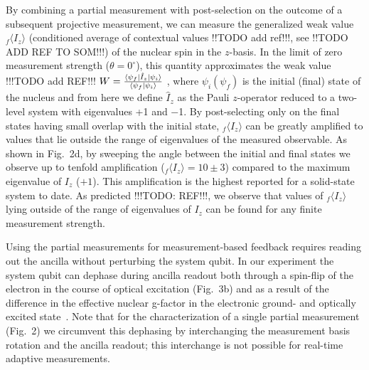 By combining a partial measurement with post-selection on the outcome of a subsequent projective measurement, we can measure the generalized weak value $_{f} \langle I_{z} \rangle$ (conditioned average of contextual values !!TODO add ref!!!, see !!TODO ADD REF TO SOM!!!) of the nuclear spin in the $z$-basis. In the limit of zero measurement strength ($\theta = 0^{\circ}$), this quantity approximates the weak value !!!TODO add REF!!!  $W = \frac{\langle \psi_f| \hat{I}_z \left|\psi_i\right\rangle}{\langle \psi_f| \psi_i \rangle}$ , where $ \psi_i (\psi_f )$ is the initial (final) state of the nucleus and from here we define $\hat{I}_z$ as the Pauli $z$-operator reduced to a two-level system with eigenvalues +1 and $-$1. By post-selecting only on the final states having small overlap with the initial state, $_{f} \langle I_{z} \rangle$ can be greatly amplified to values that lie outside the range of eigenvalues of the measured observable. As shown in Fig.~2d, by sweeping the angle between the initial and final states we observe up to tenfold amplification ($_{f} \langle I_{z} \rangle = 10 \pm 3$) compared to the maximum eigenvalue of $I_{z}$ ($+1$). This amplification is the highest reported for a solid-state system to date\cite{Groen_PRL_2013}. As predicted !!!TODO: REF!!!, we observe that values of  $_{f} \langle I_{z} \rangle$ lying outside of the range of eigenvalues of $I_{z}$ can be found for any finite measurement strength.

Using the partial measurements for measurement-based feedback requires reading out the ancilla without perturbing the system qubit. In our experiment the system qubit can dephase during ancilla readout both through a spin-flip of the electron in the course of optical excitation (Fig.~3b) and as a result of the difference in the effective nuclear g-factor in the electronic ground- and optically excited state~\cite{Jiang_PRL_2008}. Note that for the characterization of a single partial measurement (Fig.~2) we circumvent this dephasing by interchanging the measurement basis rotation and the ancilla readout; this interchange is not possible for real-time adaptive measurements.

